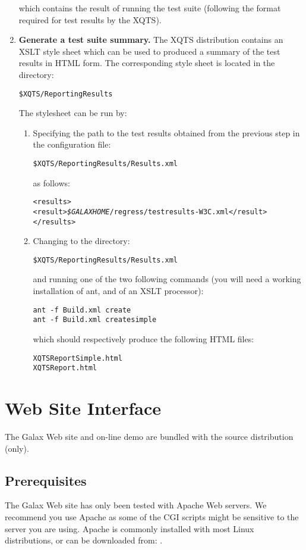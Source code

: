 \begin{enumerate}
which contains the result of running the test suite (following the
format required for test results by the XQTS).
\item {\bf Generate a test suite summary.} The XQTS distribution
contains an XSLT style sheet which can be used to produced a summary
of the test results in HTML form. The corresponding style sheet is
located in the directory:
\begin{verbatim}
$XQTS/ReportingResults
\end{verbatim}
The stylesheet can be run by:
\begin{enumerate}
\item Specifying the path to the test results obtained from the
previous step in the configuration file:
\begin{verbatim}
$XQTS/ReportingResults/Results.xml
\end{verbatim}
as follows:
\begin{alltt}
<results>
   <result>{\em\$GALAXHOME}/regress/testresults-W3C.xml</result>
</results>
\end{alltt}
\item Changing to the directory:
\begin{verbatim}
$XQTS/ReportingResults/Results.xml
\end{verbatim}
and running one of the two following commands (you will need a working
installation of ant, and of an XSLT processor):
\begin{verbatim}
ant -f Build.xml create
ant -f Build.xml createsimple
\end{verbatim}
which should respectively produce the following HTML files:
\begin{verbatim}
XQTSReportSimple.html
XQTSReport.html
\end{verbatim}
\end{enumerate}
\end{enumerate}

\section{Web Site Interface}
\label{sec:website}
  The Galax Web site and on-line demo are bundled with the source
  distribution (only).

\subsection{Prerequisites}

The Galax Web site has only been tested with Apache Web servers. We
recommend you use Apache as some of the CGI scripts might be sensitive
to the server you are using. Apache is commonly installed with most
Linux distributions, or can be downloaded from:
.

